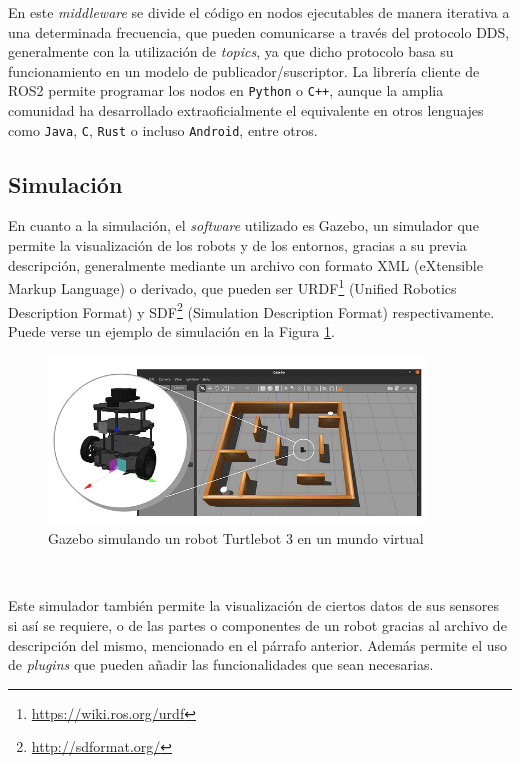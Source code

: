 En este \textit{middleware} se divide el código en nodos ejecutables de manera
iterativa a una determinada frecuencia, que pueden comunicarse a través del
protocolo DDS, generalmente con la utilización de \textit{topics}, ya que dicho
protocolo basa su funcionamiento en un modelo de publicador/suscriptor.
La librería cliente de ROS2 permite programar los nodos en \texttt{Python} o
\texttt{C++}, aunque la amplia comunidad ha desarrollado extraoficialmente el
equivalente en otros lenguajes como \texttt{Java}, \texttt{C}, \texttt{Rust} o
incluso \texttt{Android}, entre otros.


\subsection{Simulación}
\label{sec:simulacion}

En cuanto a la simulación, el \textit{software} utilizado es Gazebo, un
simulador que permite la visualización de los robots y de los entornos, gracias
a su previa descripción, generalmente mediante un archivo con formato XML
(eXtensible Markup Language) o derivado, que pueden ser
URDF\footnote{\url{https://wiki.ros.org/urdf}} (Unified Robotics Description
Format) y SDF\footnote{\url{http://sdformat.org/}} (Simulation Description
Format) respectivamente.
Puede verse un ejemplo de simulación en la Figura \ref{fig:gazebo_sim}.

\begin{figure} [h!]
  \begin{center}
    \includegraphics[width=10cm]{figs/gazebo_sim}
  \end{center}
  \caption{Gazebo simulando un robot Turtlebot 3 en un mundo virtual \citep{gazebo}}
  \label{fig:gazebo_sim}
\end{figure}\

Este simulador también permite la visualización de ciertos datos de sus sensores
si así se requiere, o de las partes o componentes de un robot gracias al archivo
de descripción del mismo, mencionado en el párrafo anterior.
Además permite el uso de \textit{plugins} que pueden añadir las funcionalidades
que sean necesarias.


